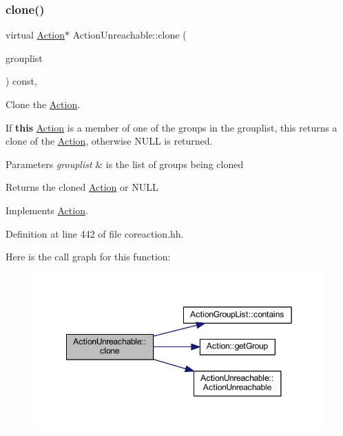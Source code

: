 \subsubsection{\texorpdfstring{clone()}{clone()}}
{\footnotesize\ttfamily virtual \mbox{\hyperlink{class_action}{Action}}$\ast$ Action\+Unreachable\+::clone (\begin{DoxyParamCaption}\item[{const \mbox{\hyperlink{class_action_group_list}{Action\+Group\+List}} \&}]{grouplist }\end{DoxyParamCaption}) const\hspace{0.3cm}{\ttfamily [inline]}, {\ttfamily [virtual]}}



Clone the \mbox{\hyperlink{class_action}{Action}}. 

If {\bfseries{this}} \mbox{\hyperlink{class_action}{Action}} is a member of one of the groups in the grouplist, this returns a clone of the \mbox{\hyperlink{class_action}{Action}}, otherwise N\+U\+LL is returned. 
\begin{DoxyParams}{Parameters}
{\em grouplist} & is the list of groups being cloned \\
\hline
\end{DoxyParams}
\begin{DoxyReturn}{Returns}
the cloned \mbox{\hyperlink{class_action}{Action}} or N\+U\+LL 
\end{DoxyReturn}


Implements \mbox{\hyperlink{class_action_af8242e41d09e5df52f97df9e65cc626f}{Action}}.



Definition at line 442 of file coreaction.\+hh.

Here is the call graph for this function\+:
\nopagebreak
\begin{figure}[H]
\begin{center}
\leavevmode
\includegraphics[width=349pt]{class_action_unreachable_a75b11d02821280b8ae5b02fcc082a13a_cgraph}
\end{center}
\end{figure}


